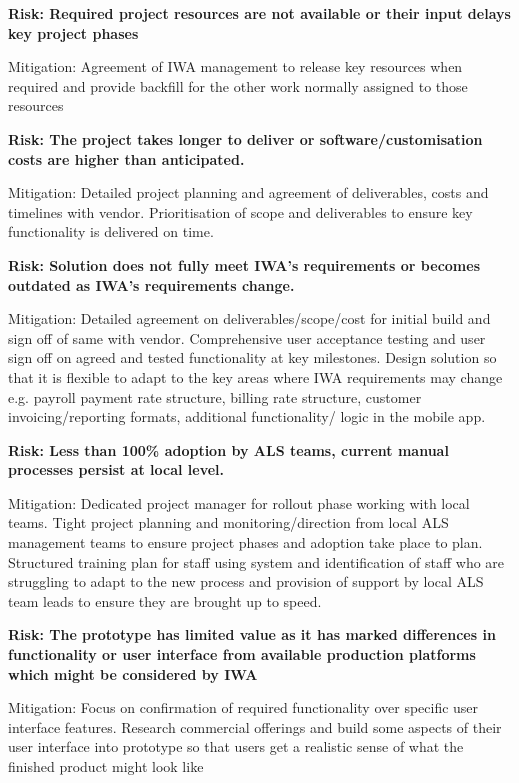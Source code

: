 \documentclass[a4paper,12pt]{article}
\begin{document}
\begin{samepage}
\noindent\makebox[\linewidth]{\rule{\paperwidth}{0.4pt}}
\textbf{Risk: Required project resources are not available or their input delays key project phases}

Mitigation: Agreement of IWA management to release key resources when required and provide backfill for the other work normally assigned to those resources

\noindent\makebox[\linewidth]{\rule{\paperwidth}{0.4pt}}
\textbf{Risk: The project takes longer to deliver or software/customisation costs are higher than anticipated.}

Mitigation: Detailed project planning and agreement of deliverables, costs and timelines with vendor. Prioritisation of scope and deliverables to ensure key functionality is delivered on time. 

\noindent\makebox[\linewidth]{\rule{\paperwidth}{0.4pt}}
\textbf{Risk: Solution does not fully meet IWA's requirements or becomes outdated as IWA's requirements change.}

Mitigation: Detailed agreement on deliverables/scope/cost for initial build and sign off of same with vendor. Comprehensive user acceptance testing and user sign off on agreed and tested functionality at key milestones. Design solution so that it is flexible to adapt to the key areas where IWA requirements may change e.g. payroll payment rate structure, billing rate structure, customer invoicing/reporting formats, additional functionality/ logic in the mobile app.

\noindent\makebox[\linewidth]{\rule{\paperwidth}{0.4pt}}
\textbf{Risk: Less than 100\% adoption by ALS teams, current manual processes persist at local level.}

Mitigation: Dedicated project manager for rollout phase working with local teams. Tight project planning and monitoring/direction from local ALS management teams to ensure project phases and adoption take place to plan. Structured training plan for staff using system and identification of staff who are struggling to adapt to the new process and provision of support by local ALS team leads to ensure they are brought up to speed.

\noindent\makebox[\linewidth]{\rule{\paperwidth}{0.4pt}}
\textbf{Risk: The prototype has limited value as it has marked differences in functionality or user interface from available production platforms which might be considered by IWA}

Mitigation: Focus on confirmation of required functionality over specific user interface features. Research commercial offerings and build some aspects of their user interface into prototype so that users get a realistic sense of what the finished product might look like
\newpage


\end{samepage}
\end{document}
